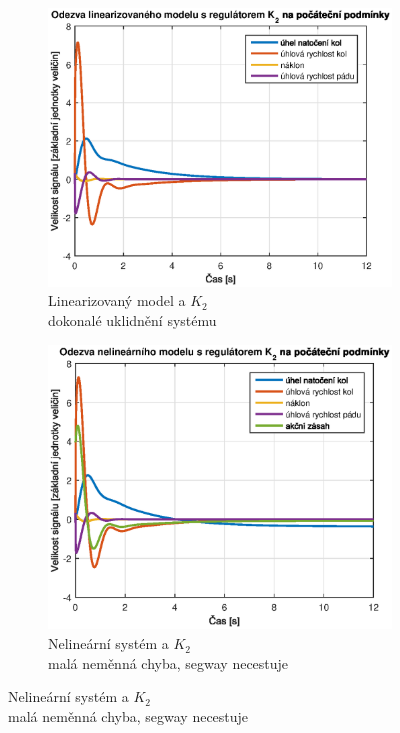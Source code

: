 \documentclass[conference]{IEEEtran}
\begin{document}
\begin{figure}[h!]
    \centering %
    \begin{subfigure}{0.45\textwidth} 
        \centerline{\includegraphics[width=\linewidth]{stavova_K2_lin.eps}}
        \caption{Linearizovaný model a $K_2$ \\ dokonalé uklidnění systému}
        \label{fig:stavova_K2_lin}        
    \end{subfigure}\hfil
    \centering %
    \begin{subfigure}{0.45\textwidth}
        \centerline{\includegraphics[width=\linewidth]{stavova_K2_nelin.eps}}
        \caption{Nelineární systém a $K_2$ \\ malá neměnná chyba, segway necestuje}
        \label{fig:stavova_K2_nelin}        
    \end{subfigure}\hfil
    

\end{figure}
\end{document}
